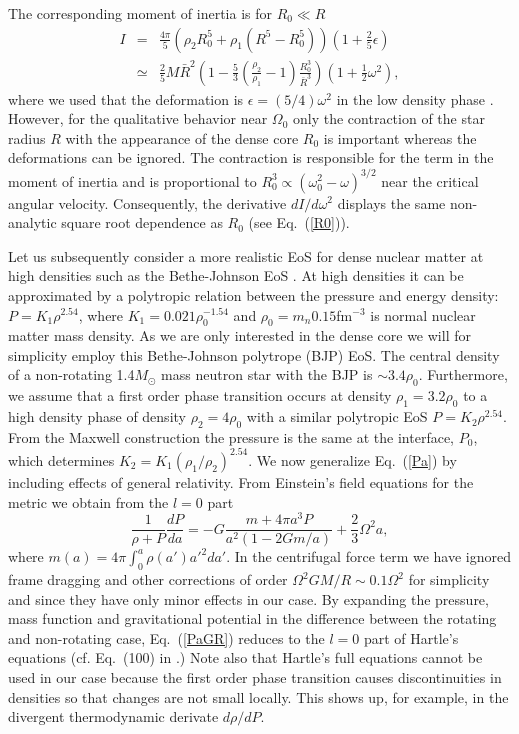 \begin{multicols}{2}
The corresponding moment of inertia is for $R_0\ll R$  
\begin{eqnarray}
   I &=& \frac{4\pi}{5} \left( \rho_2R_0^5+\rho_1(R^5-R_0^5)\right)
     (1+\frac{2}{5}\epsilon) \nonumber \\
     &\simeq& \frac{2}{5}M\bar{R}^2 
    \left( 1-\frac{5}{3}(\frac{\rho_2}{\rho_1}-1)\frac{R_0^3}{\bar{R}^3}\right)
      (1+\frac{1}{2}\omega^2),
    \label{I}
\end{eqnarray}
where we used that the deformation is $\epsilon=(5/4)\omega^2$ in the low
density phase \cite{Tassoul}. 
However, for the qualitative behavior near $\Omega_0$ only the contraction
of the star radius $R$ with the appearance of the dense core $R_0$
is important whereas the deformations can be ignored.
The contraction is responsible for the term in
the moment of inertia and is proportional to
$R_0^3\propto (\omega_0^2-\omega)^{3/2}$ near the critical angular
velocity. Consequently,  the derivative $dI/d\omega^2$ displays the same
non-analytic square root dependence as $R_0$ (see Eq.\ (\ref{R0})). 

Let us subsequently 
consider a more realistic EoS for dense nuclear matter at high
densities such as the Bethe-Johnson EoS \cite{BJ}. At
high densities it can be approximated by a polytropic relation between
the pressure and energy density:
$P=K_1\rho^{2.54}$, where 
$K_1=0.021\rho_0^{-1.54}$ and $\rho_0=m_n 0.15$fm$^{-3}$
is normal nuclear matter mass density. 
As we are only interested in the dense core we will for simplicity employ 
this Bethe-Johnson polytrope (BJP) EoS.
The central density of a non-rotating
1.4$M_\odot$
mass neutron star with the BJP is $\sim 3.4\rho_0$.
Furthermore, we assume that a first order phase
transition occurs at density $\rho_1=3.2\rho_0$ to a high density phase
of density $\rho_2=4\rho_0$ with a similar polytropic 
EoS $P=K_2\rho^{2.54}$. From the Maxwell
construction the pressure is the same at the interface, $P_0$,
which determines $K_2=K_1(\rho_1/\rho_2)^{2.54}$. 
We now generalize Eq.\   (\ref{Pa}) by including 
effects of general relativity. From Einstein's field equations for the metric
we obtain from the $l=0$ part 
\begin{equation}
  \frac{1}{\rho+P}\frac{dP}{da} = - G\frac{m+4\pi a^3P}{a^2(1-2Gm/a)} 
                    + \frac{2}{3}\Omega^2 a , 
  \label{PaGR}
\end{equation}
where $m(a)=4\pi\int_0^a\rho(a')a'^2da'$.
In the centrifugal force term
we have ignored frame dragging and other corrections of order
$\Omega^2GM/R\sim 0.1\Omega^2$ for simplicity and 
since they have only minor effects in our case.
By expanding the pressure, mass function and gravitational potential
in the difference between the rotating and non-rotating case, 
Eq.\  (\ref{PaGR}) reduces to the $l=0$ part of
Hartle's equations (cf. Eq.\  (100) in \cite{Hartle}.)
Note also that Hartle's full 
equations cannot be used in our case because the first order
phase transition causes discontinuities in densities so that changes
are not small locally. This shows up, for example, in the divergent
thermodynamic derivate $d\rho/dP$.


\end{multicols}
